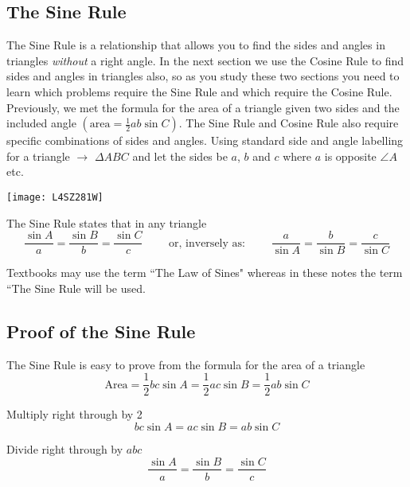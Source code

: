 \subsection*{The Sine Rule}
The Sine Rule is a relationship that allows you to find the sides and angles in triangles \textit{without} a right angle. In the next section we use the Cosine Rule to find sides and angles in triangles also, so as you study these two sections you need to learn which problems require the Sine Rule and which require the Cosine Rule. Previously, we met the formula for the area of a triangle given two sides and the included angle $\left ( \text{area}=\frac{1}{2} a b \sin  C\right )$. The Sine Rule and Cosine Rule also require specific combinations of sides and angles. Using standard side and angle labelling for a triangle $\rightarrow$ $\Delta A B C$ and let the sides be $a$, $b$ and $c$ where $a$ is opposite $\angle A$ etc. 
\begin{center}
\texttt{[image: L4SZ281W]}
\end{center}
\begin{tcolorbox}
	The Sine Rule states that in any triangle
	\begin{equation*}\frac{\sin  A}{a} =\frac{\sin  B}{b} =\frac{\sin  C}{c}\qquad%
	\text{ or, inversely as: }%
	\qquad\frac{a}{\sin  A} =\frac{b}{\sin  B} =\frac{c}{\sin  C}
	\end{equation*}\end{tcolorbox}
Textbooks may use the term ``The Law of Sines" whereas in these notes the term ``The Sine Rule will be used. 


\subsection*{Proof of the Sine Rule}
The Sine Rule is easy to prove from the formula for the area of a triangle
\begin{equation*}\text{Area} =\frac{1}{2} b c \sin  A =\frac{1}{2} a c \sin  B =\frac{1}{2} a b \sin  C
\end{equation*}

Multiply right through by 2
\begin{equation*}b c \sin  A =a c \sin  B =a b \sin  C
\end{equation*}

Divide right through by $a b c$
\begin{equation*}\frac{\sin  A}{a} =\frac{\sin  B}{b} =\frac{\sin  C}{c}
\end{equation*}

